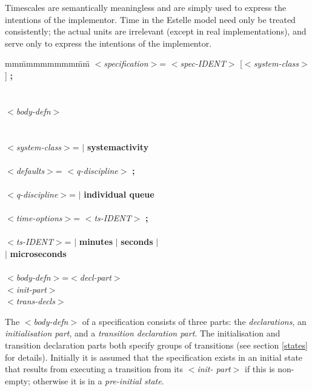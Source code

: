 Timescales are semantically meaningless and are simply
used to express the intentions of the implementor. Time in
the Estelle model need only be treated consistently; the
actual units are irrelevant (except in real
implementations), and serve only to express the intentions
of the implementor.

\begin{tabbing}
mm\=mmmmmmmm\=mm\=\+\kill
$<${\em specification}$>$\>=
 $<${\em spec-IDENT}$>$ [$<${\em system-class}$>$]{\bf
;}\\
\>\>[ $<${\em defaults}$>$ ]\\
\>\\
\>\>$<${\em body-defn}$>$\\
\>\\
\mbox{}\\
$<${\em system-class}$>$\>= $|$ {\bf systemactivity}\\
\mbox{}\\
$<${\em defaults}$>$\>= $<${\em q-discipline}$>$ {\bf ;}\\
\mbox{}\\
$<${\em q-discipline}$>$\>= $|$ {\bf individual queue}\\
\mbox{}\\
$<${\em time-options}$>$\>= $<${\em ts-IDENT}$>$ {\bf ;}\\
\mbox{}\\
$<${\em ts-IDENT}$>$\>= $|$ {\bf minutes} $|$ {\bf seconds} $|$\\
\> $|$ {\bf microseconds}\\
\mbox{}\\
$<${\em body-defn}$>$\>=\>$<${\em decl-part}$>$\\
\>\>$<${\em init-part}$>$\\
\>\>$<${\em trans-decls}$>$\\
\end{tabbing}

The $<${\em body-defn}$>$ of a specification consists of three
parts: the {\em declarations}, an {\em initialisation part}, and a
{\em transition declaration part}. The initialisation and
transition declaration parts both specify groups of
transitions (see section \ref{states} for details). Initially it is
assumed that the specification exists in an initial state
that results from executing a transition from its $<${\em init-
part}$>$ if this is non-empty; otherwise it is in a {\em pre-initial
state}.

